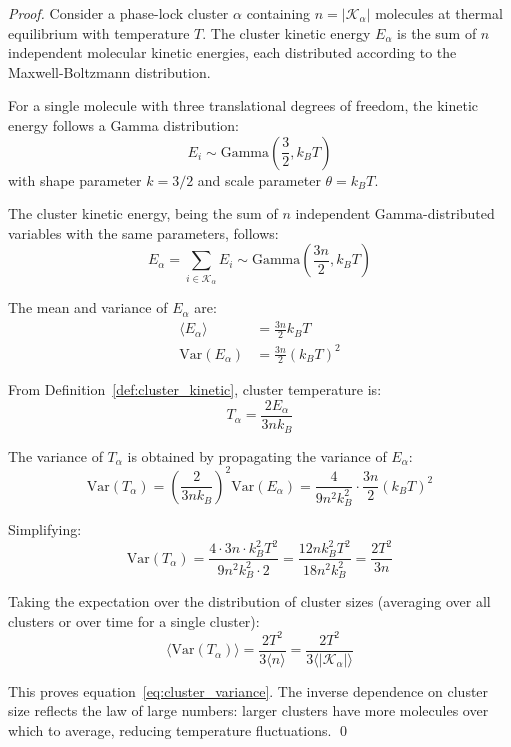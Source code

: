 \documentclass[12pt,a4paper]{article}
\theoremstyle{definition}
\theoremstyle{remark}
\begin{document}
\begin{proof}
Consider a phase-lock cluster $\alpha$ containing $n = |\mathcal{K}_\alpha|$ molecules at thermal equilibrium with temperature $T$. The cluster kinetic energy $E_\alpha$ is the sum of $n$ independent molecular kinetic energies, each distributed according to the Maxwell-Boltzmann distribution.

For a single molecule with three translational degrees of freedom, the kinetic energy follows a Gamma distribution:
\begin{equation}
E_i \sim \text{Gamma}\left(\frac{3}{2}, k_B T\right)
\end{equation}
with shape parameter $k = 3/2$ and scale parameter $\theta = k_B T$.

The cluster kinetic energy, being the sum of $n$ independent Gamma-distributed variables with the same parameters, follows:
\begin{equation}
E_\alpha = \sum_{i \in \mathcal{K}_\alpha} E_i \sim \text{Gamma}\left(\frac{3n}{2}, k_B T\right)
\end{equation}

The mean and variance of $E_\alpha$ are:
\begin{align}
\langle E_\alpha \rangle &= \frac{3n}{2} k_B T \\
\text{Var}(E_\alpha) &= \frac{3n}{2} (k_B T)^2
\end{align}

From Definition~\ref{def:cluster_kinetic}, cluster temperature is:
\begin{equation}
T_\alpha = \frac{2 E_\alpha}{3 n k_B}
\end{equation}

The variance of $T_\alpha$ is obtained by propagating the variance of $E_\alpha$:
\begin{equation}
\text{Var}(T_\alpha) = \left(\frac{2}{3 n k_B}\right)^2 \text{Var}(E_\alpha) = \frac{4}{9 n^2 k_B^2} \cdot \frac{3n}{2} (k_B T)^2
\end{equation}

Simplifying:
\begin{equation}
\text{Var}(T_\alpha) = \frac{4 \cdot 3n \cdot k_B^2 T^2}{9 n^2 k_B^2 \cdot 2} = \frac{12 n k_B^2 T^2}{18 n^2 k_B^2} = \frac{2 T^2}{3 n}
\end{equation}

Taking the expectation over the distribution of cluster sizes (averaging over all clusters or over time for a single cluster):
\begin{equation}
\langle \text{Var}(T_\alpha) \rangle = \frac{2 T^2}{3 \langle n \rangle} = \frac{2 T^2}{3 \langle |\mathcal{K}_\alpha| \rangle}
\end{equation}

This proves equation~\eqref{eq:cluster_variance}. The inverse dependence on cluster size reflects the law of large numbers: larger clusters have more molecules over which to average, reducing temperature fluctuations. \qed
\end{proof}
\end{document}
